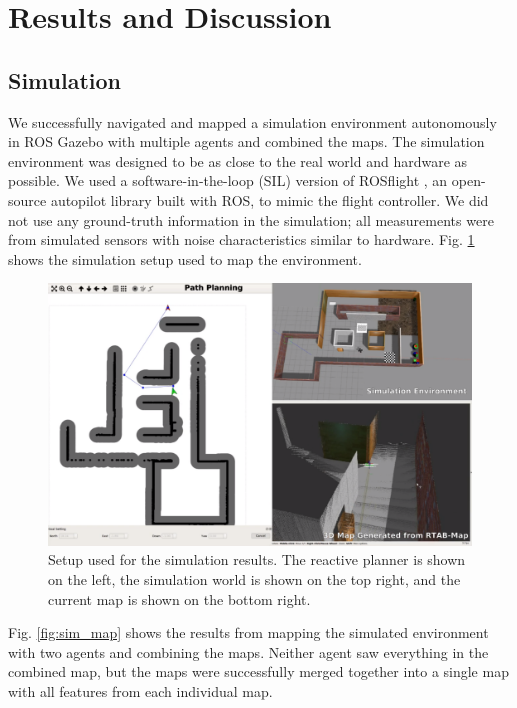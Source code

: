 \documentclass[letterpaper, 10 pt, conference]{ieeeconf}  %
\begin{document}
\section{Results and Discussion}\label{nav_results}

\subsection{Simulation}

We successfully navigated and mapped a simulation environment autonomously in ROS Gazebo \cite{OSRF} with multiple agents and combined the maps. The simulation environment was designed to be as close to the real world and hardware as possible. We used a software-in-the-loop (SIL) version of ROSflight \cite{Jackson2016a}, an open-source autopilot library built with ROS, to mimic the flight controller. We did not use any ground-truth information in the simulation; all measurements were from simulated sensors with noise characteristics similar to hardware. Fig. \ref{fig:sim_setup} shows the simulation setup used to map the environment.

\begin{figure}
\centering
\includegraphics[width=1.0\linewidth]{sim_setup}
\caption[Setup used for map merging simulation results.]{Setup used for the simulation results. The reactive planner is shown on the left, the simulation world is shown on the top right, and the current map is shown on the bottom right.}
\label{fig:sim_setup}
\end{figure}

Fig. \ref{fig:sim_map} shows the results from mapping the simulated environment with two agents and combining the maps. Neither agent saw everything in the combined map, but the maps were successfully merged together into a single map with all features from each individual map.
\end{document}
